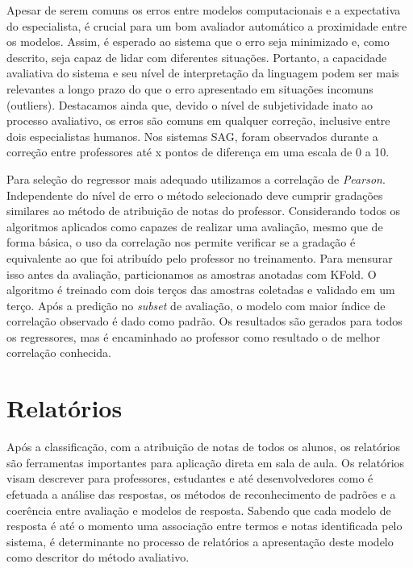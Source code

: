 
Apesar de serem comuns os erros entre modelos computacionais e a expectativa do especialista, é crucial para um bom avaliador automático a proximidade entre os modelos. Assim, é esperado ao sistema que o erro seja minimizado e, como descrito, seja capaz de lidar com diferentes situações. Portanto, a capacidade avaliativa do sistema e seu nível de interpretação da linguagem podem ser mais relevantes a longo prazo do que o erro apresentado em situações incomuns (outliers). Destacamos ainda que, devido o nível de subjetividade inato ao processo avaliativo, os erros são comuns em qualquer correção, inclusive entre dois especialistas humanos. Nos sistemas SAG, foram observados durante a correção entre professores até x pontos de diferença em uma escala de 0 a 10. 

Para seleção do regressor mais adequado utilizamos a correlação de \textit{Pearson}. Independente do nível de erro o método selecionado deve cumprir gradações similares ao método de atribuição de notas do professor. Considerando todos os algoritmos aplicados como capazes de realizar uma avaliação, mesmo que de forma básica, o uso da correlação nos permite verificar se a gradação é equivalente ao que foi atribuído pelo professor no treinamento. Para mensurar isso antes da avaliação, particionamos as amostras anotadas com KFold. O algoritmo é treinado com dois terços das amostras coletadas e validado em um terço. Após a predição no \textit{subset} de avaliação, o modelo com maior índice de correlação observado é dado como padrão. Os resultados são gerados para todos os regressores, mas é encaminhado ao professor como resultado o de melhor correlação conhecida.

\section{Relatórios}

Após a classificação, com a atribuição de notas de todos os alunos, os relatórios são ferramentas importantes para aplicação direta em sala de aula. Os relatórios visam descrever para professores, estudantes e até desenvolvedores como é efetuada a análise das respostas, os métodos de reconhecimento de padrões e a coerência entre avaliação e modelos de resposta. Sabendo que cada modelo de resposta é até o momento uma associação entre termos e notas identificada pelo sistema, é determinante no processo de relatórios a apresentação deste modelo como descritor do método avaliativo.

